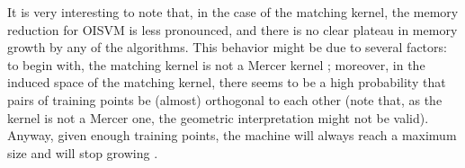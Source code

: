 It is very interesting to note that, in the case of the matching
kernel, the memory reduction for OISVM is less pronounced, and there
is no clear plateau in memory growth by any of the algorithms.  This
behavior might be due to several factors: to begin with, the matching
kernel is not a Mercer kernel \cite{BoughorbelTF04}; moreover, in the
induced space of the matching kernel, there seems to be a high
probability that pairs of training points be (almost) orthogonal to
each other (note that, as the kernel is not a Mercer one, the
geometric interpretation might not be valid). Anyway, given enough
training points, the machine will always reach a maximum size and will
stop growing \cite{EngelMM04}.


